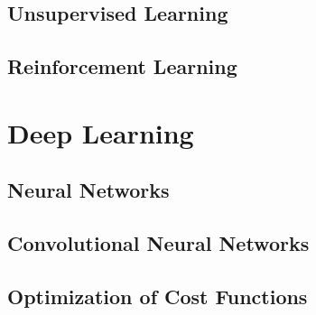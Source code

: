 \subsection{Unsupervised Learning}
\subsection{Reinforcement Learning}

\section{Deep Learning}
\subsection{Neural Networks}
\subsection{Convolutional Neural Networks}
\subsection{Optimization of Cost Functions}

